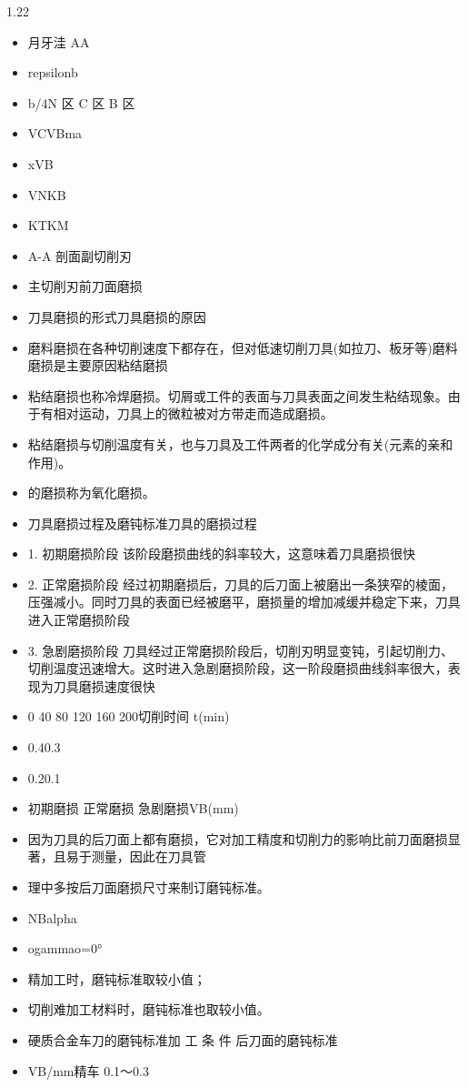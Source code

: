 \documentclass[12pt,a4paper]{article}
\begin{document}
\begin{spacing}{1.22}
\begin{itemize}[leftmargin=2.2em,label=--]
  \item 月牙洼 AA
  \item repsilonb
  \item b/4N 区 C 区 B 区
  \item VCVBma
  \item xVB
  \item VNKB
  \item KTKM
  \item A-A 剖面副切削刃
  \item 主切削刃前刀面磨损
  \item 刀具磨损的形式刀具磨损的原因
  \item 磨料磨损在各种切削速度下都存在，但对低速切削刀具(如拉刀、板牙等)磨料磨损是主要原因粘结磨损
  \item 粘结磨损也称冷焊磨损。切屑或工件的表面与刀具表面之间发生粘结现象。由于有相对运动，刀具上的微粒被对方带走而造成磨损。
  \item 粘结磨损与切削温度有关，也与刀具及工件两者的化学成分有关(元素的亲和作用)。
  \item 的磨损称为氧化磨损。
  \item 刀具磨损过程及磨钝标准刀具的磨损过程
  \item 1. 初期磨损阶段 该阶段磨损曲线的斜率较大，这意味着刀具磨损很快
  \item 2. 正常磨损阶段 经过初期磨损后，刀具的后刀面上被磨出一条狭窄的棱面，压强减小。同时刀具的表面已经被磨平，磨损量的增加减缓并稳定下来，刀具进入正常磨损阶段
  \item 3. 急剧磨损阶段 刀具经过正常磨损阶段后，切削刃明显变钝，引起切削力、切削温度迅速增大。这时进入急剧磨损阶段，这一阶段磨损曲线斜率很大，表现为刀具磨损速度很快
  \item 0 40 80 120 160 200切削时间 t(min)
  \item 0.40.3
  \item 0.20.1
  \item 初期磨损 正常磨损 急剧磨损VB(mm)
  \item 因为刀具的后刀面上都有磨损，它对加工精度和切削力的影响比前刀面磨损显著，且易于测量，因此在刀具管
  \item 理中多按后刀面磨损尺寸来制订磨钝标准。
  \item NBalpha
  \item ogammao=0°
  \item 精加工时，磨钝标准取较小值；
  \item 切削难加工材料时，磨钝标准也取较小值。
  \item 硬质合金车刀的磨钝标准加 工 条 件 后刀面的磨钝标准
  \item VB/mm精车 0.1～0.3

\end{itemize}
\end{spacing}
\end{document}
